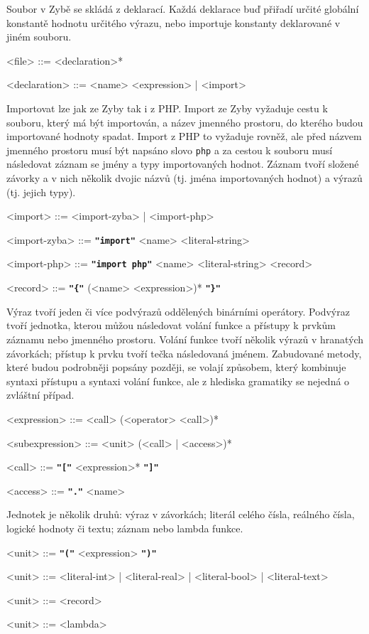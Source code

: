 \documentclass[a4paper,12pt]{article}
\def\emphasis #1{\textbf{\texttt{"#1"}}}
\begin{document}
Soubor v Zybě se skládá z deklarací. Každá deklarace buď přiřadí určité globální konstantě hodnotu určitého výrazu, nebo importuje konstanty deklarované v jiném souboru.
\begin{grammar}
<file> ::= <declaration>*

<declaration> ::= <name> <expression> | <import>
\end{grammar}

Importovat lze jak ze Zyby tak i z PHP. Import ze Zyby vyžaduje cestu k souboru, který má být importován, a název jmenného prostoru, do kterého budou importované hodnoty spadat. Import z PHP to vyžaduje rovněž, ale před názvem jmenného prostoru musí být napsáno slovo \texttt{php} a za cestou k souboru musí následovat záznam se jmény a typy importovaných hodnot. Záznam tvoří složené závorky a v nich několik dvojic názvů (tj. jména importovaných hodnot) a výrazů (tj. jejich typy).
\begin{grammar}
<import> ::= <import-zyba> | <import-php>

<import-zyba> ::= \emphasis{import} <name> <literal-string>

<import-php> ::= \emphasis{import php} <name> <literal-string> <record>

<record> ::= \emphasis{\{} (<name> <expression>)* \emphasis{\}}
\end{grammar}

Výraz tvoří jeden či více podvýrazů oddělených binárními operátory. Podvýraz tvoří jednotka, kterou můžou následovat volání funkce a přístupy k prvkům záznamu nebo jmenného prostoru. Volání funkce tvoří několik výrazů v hranatých závorkách; přístup k prvku tvoří tečka následovaná jménem. Zabudované metody, které budou podrobněji popsány později, se volají způsobem, který kombinuje syntaxi přístupu a syntaxi volání funkce, ale z hlediska gramatiky se nejedná o zvláštní případ.
\begin{grammar}
<expression> ::= <call> (<operator> <call>)*

<subexpression> ::= <unit> (<call> | <access>)*

<call> ::= \emphasis{[} <expression>* \emphasis{]}

<access> ::= \emphasis{.} <name>
\end{grammar}

Jednotek je několik druhů: výraz v závorkách; literál celého čísla, reálného čísla, logické hodnoty či textu; záznam nebo lambda funkce.
\begin{grammar}
<unit> ::= \emphasis{(} <expression> \emphasis{)}

<unit> ::= <literal-int> | <literal-real> | <literal-bool> | <literal-text>

<unit> ::= <record>

<unit> ::= <lambda>
\end{grammar}
\end{document}
